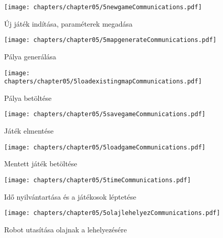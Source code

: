 \begin{figure}[h]
	\begin{center}
		\texttt{[image: chapters/chapter05/5newgameCommunications.pdf]}
		\caption{Új játék indítása, paraméterek megadása}
		\label{fig:5newgameCommunication}
	\end{center}
\end{figure}

\begin{figure}[h]
	\begin{center}
		\texttt{[image: chapters/chapter05/5mapgenerateCommunications.pdf]}
		\caption{Pálya generálása}
		\label{fig:5mapgenerateCommunication}
	\end{center}
\end{figure}

\begin{figure}[h]
	\begin{center}
		\texttt{[image: chapters/chapter05/5loadexistingmapCommunications.pdf]}
		\caption{Pálya betöltése}
		\label{fig:5loadexistingmapCommunication}
	\end{center}
\end{figure}

\begin{figure}[h]
	\begin{center}
		\texttt{[image: chapters/chapter05/5savegameCommunications.pdf]}
		\caption{Játék elmentése}
		\label{fig:5savegameCommunication}
	\end{center}
\end{figure}



\begin{figure}[h]
	\begin{center}
		\texttt{[image: chapters/chapter05/5loadgameCommunications.pdf]}
		\caption{Mentett játék betöltése}
		\label{fig:5loadgameCommunication}
	\end{center}
\end{figure}

\begin{figure}[h]
	\begin{center}
		\texttt{[image: chapters/chapter05/5timeCommunications.pdf]}
		\caption{Idő nyilvántartása és a játékosok léptetése}
		\label{fig:5timeCommunication}
	\end{center}
\end{figure}

\begin{figure}[h]
	\begin{center}
		\texttt{[image: chapters/chapter05/5olajlehelyezCommunications.pdf]}
		\caption{Robot utasítása olajnak a lehelyezésére}
		\label{fig:5robotolajlehelyezCommunication}
	\end{center}
\end{figure}

